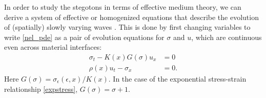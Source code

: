 In order to study the stegotons in terms of effective medium theory,
we can derive a system 
of effective or homogenized equations that describe the
evolution of (spatially) slowly varying waves \cite{leveque2003}.  
This is done by first changing
variables to write \eqref{nel_pde} as a pair of evolution
equations for $\sigma$ and $u$, which are continuous even
across material interfaces:
\begin{subequations}
\begin{align} \label{nel_inv}
\sigma_t - K(x)G(\sigma)u_x & = 0 \\
\rho(x) u_t - \sigma_x & = 0.
\end{align}
\end{subequations}
Here $G(\sigma)=\sigma_\epsilon(\epsilon,x)/K(x)$.  In the 
case of the exponential stress-strain relationship 
\eqref{expstress}, $G(\sigma)=\sigma+1$.

